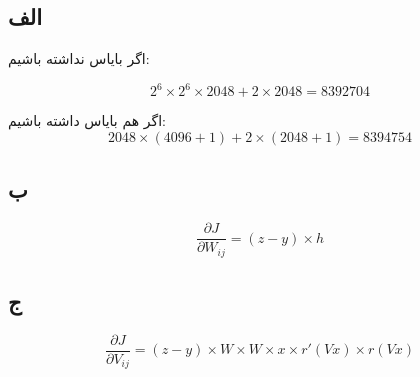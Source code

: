 \subsection*{الف}

اگر بایاس نداشته باشیم:

$$
2^6 \times 2^6 \times 2048 + 2 \times 2048 = 8392704
$$

اگر هم بایاس داشته باشیم:
$$
2048 \times (4096 + 1) + 2 \times (2048 + 1) = 8394754
$$


\subsection*{ب}

$$
\frac{\partial J}{\partial W_{ij}} = (z - y) \times h
$$

\subsection*{ج}

$$
\frac{\partial J}{\partial V_{ij}} = (z - y) \times W \times W \times x \times r'(Vx) \times r(Vx)
$$